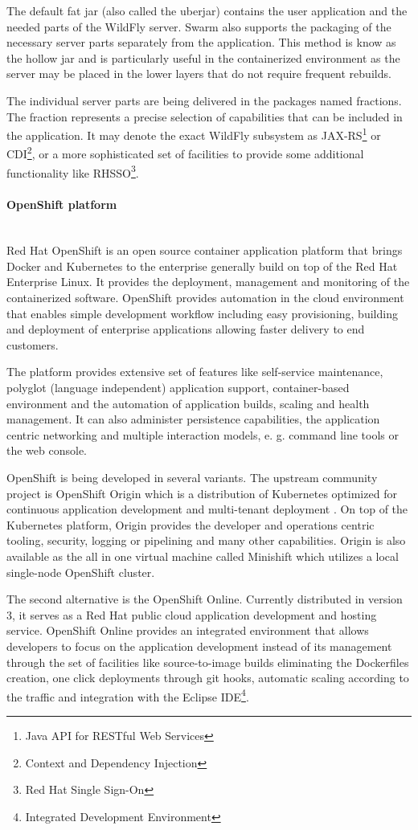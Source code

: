 \documentclass[oneside,
  digital, %
  table,   %
  nolof,     %
  nolot,     %
]{fithesis3}
\newcommand{\newlinepar}[1]{\paragraph{#1}\needspace{4\baselineskip}\mbox{}\\}
\begin{document}
The default fat jar (also called the uberjar) contains the user application and the needed parts of the WildFly server. Swarm also supports the packaging of the necessary server parts separately from the application. This method is know as the hollow jar and is particularly useful in the containerized environment as the server may be placed in the lower layers that do not require frequent rebuilds.

The individual server parts are being delivered in the packages named fractions. The fraction represents a precise selection of capabilities that can be included in the application. It may denote the exact WildFly subsystem as JAX-RS\footnote{Java API for RESTful Web Services} or CDI\footnote{Context and Dependency Injection}, or a more sophisticated set of facilities to provide some additional functionality like RHSSO\footnote{Red Hat Single Sign-On}.

\newlinepar{OpenShift platform}

Red Hat OpenShift is an open source container application platform that  brings Docker and Kubernetes to the enterprise \cite{openshift} generally build on top of the Red Hat Enterprise Linux. It provides the deployment, management and monitoring of the containerized software. OpenShift provides automation in the cloud environment that enables simple development workflow including easy provisioning, building and deployment of enterprise applications allowing faster delivery to end customers.

The platform provides extensive set of features like self-service maintenance, polyglot (language independent) application support, container-based environment and the automation of application builds, scaling and health management. It can also administer persistence capabilities, the application centric networking and multiple interaction models, e. g. command line tools or the web console.

OpenShift is being developed in several variants. The upstream community project is OpenShift Origin which is a distribution of Kubernetes optimized for continuous application development and multi-tenant deployment \cite{openshift}. On top of the Kubernetes platform, Origin provides the developer and operations centric tooling, security, logging or pipelining and many other capabilities. Origin is also available as the all in one virtual machine called Minishift which utilizes a local single-node OpenShift cluster. 

The second alternative is the OpenShift Online. Currently distributed in version 3, it serves as a Red Hat public cloud application development and hosting service. OpenShift Online provides an integrated environment that allows developers to focus on the application development instead of its management through the set of facilities like source-to-image builds eliminating the Dockerfiles creation, one click deployments through git hooks, automatic scaling according to the traffic and integration with the Eclipse IDE\footnote{Integrated Development Environment}.
\end{document}
